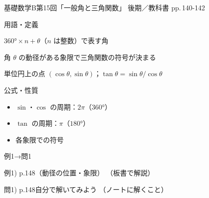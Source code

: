 \documentclass[aspectratio=43,professionalfonts,handout]{beamer}
\newcommand{\LectureNum}{15}
\newcommand{\LectureTitle}{一般角と三角関数}
\newcommand{\TextPages}{pp.\,140-142}
\newcommand{\CourseName}{基礎数学B}
\renewcommand{\TermName}{後期}
\begin{document}
\begin{frame}{\CourseName\quad 第\LectureNum 回「\LectureTitle 」}
  {\small \TermName\quad \TeacherName\quad ／\quad 教科書 \TextPages}

  \begin{block}{用語・定義}
  \begin{description}[labelwidth=5.5em]
    \item[\kw{一般角：$360° \times n + \theta$ で表す}] $360° \times n + \theta$（$n$ は整数）で表す角
    \item[\kw{動径と象限}] 角 $\theta$ の動径がある象限で三角関数の符号が決まる
    \item[\kw{単位円上の定義：$\sin\theta = y$、$\cos\theta = x$、$\tan\theta = y/x$}] 単位円上の点 $(\cos\theta, \sin\theta)$；$\tan\theta = \sin\theta / \cos\theta$
  \end{description}
  \end{block}
\end{frame}

\begin{frame}{公式・性質}
  \begin{block}{}
  \begin{itemize}
    \item $\sin$・$\cos$ の周期：$2\pi$（$360°$）
    \item $\tan$ の周期：$\pi$（$180°$）
    \item 各象限での符号
  \end{itemize}
  \end{block}
\end{frame}

\begin{frame}{例1→問1}
  \begin{exampleblock}{例1) p.148（動径の位置・象限）}
    （板書で解説）
  \end{exampleblock}

  \vfill

  \begin{block}{問1) p.148\quad 自分で解いてみよう}
    （ノートに解くこと）
  \end{block}
\end{frame}
\end{document}
